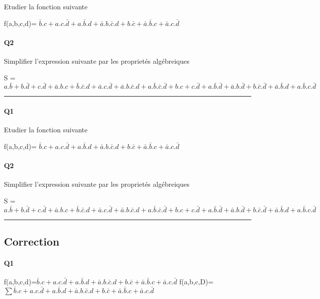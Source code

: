 Etudier la fonction suivante

f(a,b,c,d)= $\bar b.c+a.c.\bar d+a.\bar b.d+\bar a.b.\bar c.d + b.\bar c+\bar a.\bar b.c+\bar a.c.\bar d$

\paragraph{Q2}

Simplifier l'expression suivante par les proprietés algébreiques 

S = $a.\bar b+b.\bar d+c.\bar d+\bar a.b.c+\bar b.\bar c.d + \bar a.c.\bar d+\bar a.b.\bar c.d+a.\bar b.\bar c.\bar d + b.c+c.\bar d+a.\bar b.\bar d+\bar a.b.\bar d + b.\bar c.\bar d+\bar a.\bar b.d+a.\bar b.c.\bar d$

\hrule width 1\linewidth
\paragraph{Q1}

Etudier la fonction suivante

f(a,b,c,d)= $\bar b.c+a.c.\bar d+a.\bar b.d+\bar a.b.\bar c.d + b.\bar c+\bar a.\bar b.c+\bar a.c.\bar d$

\paragraph{Q2}

Simplifier l'expression suivante par les proprietés algébreiques 

S = $a.\bar b+b.\bar d+c.\bar d+\bar a.b.c+\bar b.\bar c.d + \bar a.c.\bar d+\bar a.b.\bar c.d+a.\bar b.\bar c.\bar d + b.c+c.\bar d+a.\bar b.\bar d+\bar a.b.\bar d + b.\bar c.\bar d+\bar a.\bar b.d+a.\bar b.c.\bar d$

\hrule width 1\linewidth\pagebreak
\subsection{Correction}

\paragraph{Q1}

f(a,b,c,d)=$\bar b.c+a.c.\bar d+a.\bar b.d+\bar a.b.\bar c.d + b.\bar c+\bar a.\bar b.c+\bar a.c.\bar d$
f(a,b,c,D)=$ \sum \bar b.c+a.c.\bar d+a.\bar b.d+\bar a.b.\bar c.d + b.\bar c+\bar a.\bar b.c+\bar a.c.\bar d $ 

